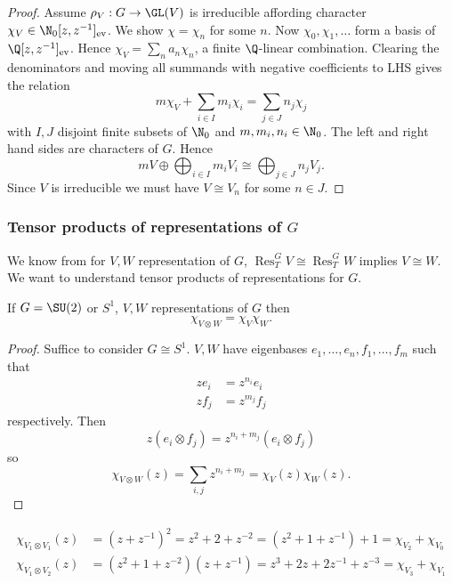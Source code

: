 \documentclass[a4paper]{article}
\DeclareMathOperator{\Res}{Res} %
\theoremstyle{definition}
\begin{document}
\begin{proof}
  Assume \(\rho_V: G \to \GL(V)\) is irreducible affording character \(\chi_V \in \N_0[z, z^{-1}]_{\text{ev}}\). We show \(\chi = \chi_n\) for some \(n\). Now \(\chi_0, \chi_1, \dots\) form a basis of \(\Q[z, z^{-1}]_{\text{ev}}\). Hence \(\chi_V = \sum_n a_n \chi_n\), a finite \(\Q\)-linear combination. Clearing the denominators and moving all summands with negative coefficients to LHS gives the relation
  \[
    m\chi_V + \sum_{i \in I} m_i \chi_i = \sum_{j \in J} n_j \chi_j
  \]
  with \(I, J\) disjoint finite subsets of \(\N_0\) and \(m, m_i, n_i \in \N_0\). The left and right hand sides are characters of \(G\). Hence
  \[
    m V \oplus \bigoplus_{i \in I} m_i V_i \cong \bigoplus_{j \in J} n_j V_j.
  \]
  Since \(V\) is irreducible we must have \(V \cong V_n\) for some \(n \in J\).
\end{proof}

\subsubsection{Tensor products of representations of \(G\)}

We know from  for \(V, W\) representation of \(G\), \(\Res_T^G V \cong \Res_T^G W\) implies \(V \cong W\). We want to understand tensor products of representations for \(G\).

\begin{proposition}
  If \(G = \SU(2)\) or \(S^1\), \(V, W\) representations of \(G\) then
  \[
    \chi_{V \otimes W} = \chi_V \chi_W.
  \]
\end{proposition}

\begin{proof}
  Suffice to consider \(G \cong S^1\). \(V, W\) have eigenbases \(e_1, \dots, e_n, f_1, \dots, f_m\) such that
  \begin{align*}
    z e_i &= z^{n_i} e_i \\
    z f_j &= z^{m_j} f_j
  \end{align*}
  respectively. Then
  \[
    z(e_i \otimes f_j) = z^{n_i + m_j} (e_i \otimes f_j)
  \]
  so
  \[
    \chi_{V \otimes W} (z) = \sum_{i, j} z^{n_i + m_j} = \chi_V(z) \chi_W(z).
  \]
\end{proof}

\begin{eg}
  \begin{align*}
    \chi_{V_1 \otimes V_1}(z) &= (z + z^{-1})^2 = z^2 + 2 + z^{-2} = (z^2 + 1 + z^{-1}) + 1 = \chi_{V_2} + \chi_{V_0} \\
    \chi_{V_1 \otimes V_2}(z) &= (z^2 + 1 + z^{-2}) (z + z^{-1}) = z^3 + 2z + 2z^{-1} + z^{-3} = \chi_{V_3} + \chi_{V_1}
  \end{align*}
\end{eg}
\end{document}
